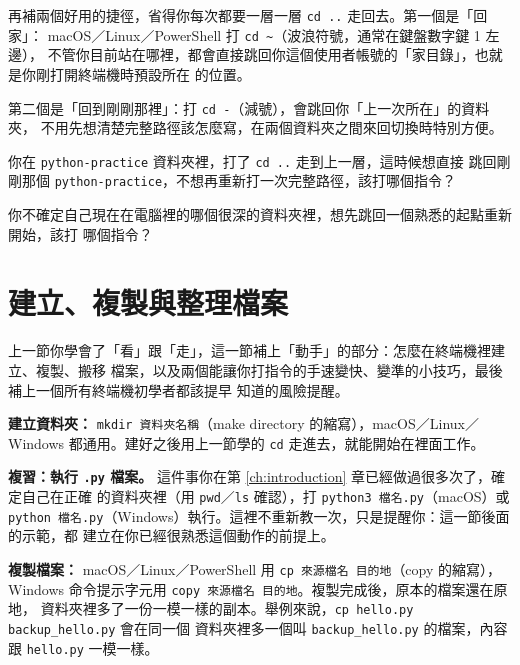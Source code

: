 
再補兩個好用的捷徑，省得你每次都要一層一層 \texttt{cd ..} 走回去。第一個是「回家」：
macOS／Linux／PowerShell 打 \texttt{cd \textasciitilde}（波浪符號，通常在鍵盤數字鍵 1 左邊），
不管你目前站在哪裡，都會直接跳回你這個使用者帳號的「家目錄」，也就是你剛打開終端機時預設所在
的位置。

第二個是「回到剛剛那裡」：打 \texttt{cd -}（減號），會跳回你「上一次所在」的資料夾，
不用先想清楚完整路徑該怎麼寫，在兩個資料夾之間來回切換時特別方便。

\begin{drills}[label=drills:terminal-location]
\item 你在 \texttt{python-practice} 資料夾裡，打了 \texttt{cd ..} 走到上一層，這時候想直接
跳回剛剛那個 \texttt{python-practice}，不想再重新打一次完整路徑，該打哪個指令？
\item 你不確定自己現在在電腦裡的哪個很深的資料夾裡，想先跳回一個熟悉的起點重新開始，該打
哪個指令？
\end{drills}

\section{建立、複製與整理檔案}
\label{sec:cli-basics}

上一節你學會了「看」跟「走」，這一節補上「動手」的部分：怎麼在終端機裡建立、複製、搬移
檔案，以及兩個能讓你打指令的手速變快、變準的小技巧，最後補上一個所有終端機初學者都該提早
知道的風險提醒。

\textbf{建立資料夾：} \texttt{mkdir 資料夾名稱}（make directory 的縮寫），macOS／Linux／
Windows 都通用。建好之後用上一節學的 \texttt{cd} 走進去，就能開始在裡面工作。

\textbf{複習：執行 \texttt{.py} 檔案。} 這件事你在第 \ref{ch:introduction} 章已經做過很多次了，確定自己在正確
的資料夾裡（用 \texttt{pwd}／\texttt{ls} 確認），打 \texttt{python3 檔名.py}（macOS）或
\texttt{python 檔名.py}（Windows）執行。這裡不重新教一次，只是提醒你：這一節後面的示範，都
建立在你已經很熟悉這個動作的前提上。

\textbf{複製檔案：} macOS／Linux／PowerShell 用 \texttt{cp 來源檔名 目的地}（copy 的縮寫），
Windows 命令提示字元用 \texttt{copy 來源檔名 目的地}。複製完成後，原本的檔案還在原地，
資料夾裡多了一份一模一樣的副本。舉例來說，\texttt{cp hello.py backup\_hello.py} 會在同一個
資料夾裡多一個叫 \texttt{backup\_hello.py} 的檔案，內容跟 \texttt{hello.py} 一模一樣。


